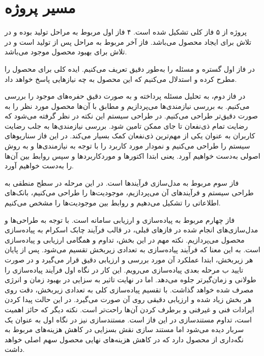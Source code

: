 \section{مسیر پروژه}
پروژه از ۵ فاز کلی تشکیل شده است. ۴ فاز اول مربوط به مراحل تولید بوده و در تلاش برای ایجاد محصول می‌باشد. فاز آخر مربوط به مراحل پس از تولید است و در تلاش برای بهبود محصول موجود می‌باشد.

در فاز اول گستره و مسئله را به‌طور دقیق تعریف می‌کنیم. ایده‌ کلی برای محصول را مطرح کرده و استدلال می‌کنیم که این محصول به چه نیازهایی پاسخ خواهد داد.

در فاز دوم، به تحلیل مسئله 
پرداخته و به صورت دقیق حفره‌های موجود را بررسی می‌کنیم. به بررسی نیازمندی‌ها 
می‌پردازیم و مطابق با آن‌ها محصول مورد نظر را به صورت دقیق‌تر طراحی می‌کنیم. در طراحی سیستم این نکته در نظر گرفته می‌شود که رضایت تمام ذی‌نفعان تا جای ممکن تامین شود. بررسی نیازمندی‌ها به جلب رضایت کاربران به عنوان یکی از مهم‌ترین ذی‌نفعان کمک بسیار می‌کند.
در این فاز سناریو‌های سیستم را طراحی می‌کنیم و نمودار مورد کاربرد 
را با توجه به نیازمندی‌ها و به روش اصولی به‌دست خواهیم آورد. یعنی ابتدا اکتورها و موردکاربردها و سپس روابط بین آن‌ها را به‌دست خواهیم آورد.

فاز سوم مربوط به مدل‌سازی فرآیندها است. در این مرحله در سطح منطقی 
به طراحی سیستم و فرآیند‌های آن می‌پردازیم، موجودیت‌‌ها را طراحی می‌کنیم، بانک‌های اطلاعاتی را تشکیل می‌دهیم و روابط بین موجودیت‌ها را مشخص می‌کنیم.

فاز چهارم مربوط به پیاده‌سازی و ارزیابی سامانه است. با توجه به طراحی‌ها و مدل‌سازی‌های انجام شده در فازهای قبلی،‌ در قالب فرآیند چابک اسکرام به پیاده‌سازی محصول می‌پردازیم. نکته مهم در این بخش، تداوم و همگامی ارزیابی و پیاده‌سازی است. به این معنا که فرآیند پیاده‌سازی به تعدادی زیربخش تقسیم می‌شود. پس از پایان هر زیربخش، ابتدا عملکرد آن مورد بررسی و ارزیابی دقیق قرار می‌گیرد و در صورت تایید ب مرحله بعدی پیاده‌سازی می‌رویم. این کار در نگاه اول فرآیند پیاده‌سازی را طولانی و زمان‌گیرتر جلوه می‌دهد. اما در نهایت تاثیر به سزایی در بهبود زمان و انرژی مصرف شده خواهد گذاشت. با تقسیم پیاده‌سازی کلی به تعدادی زیربخش، دقت روی هر بخش زیاد شده و ارزیابی دقیقی روی آن صورت می‌گیرد. در این حالت پیدا کردن ایرادات فنی و غیرفنی و برطرف کردن آن‌ها راحت‌تر است. 
نکته دیگر که حائز اهمیت است، تداوم مستندسازی در این فاز است. مستندسازی نیز در نگاه اول به عنوان یک سربار دیده می‌شود اما مستند سازی نقش بسزایی در کاهش هزینه‌های مربوط به نگه‌داری از محصول دارد که در کاهش هزینه‌های نهایی محصول سهم اصلی خواهد داشت.

